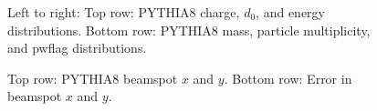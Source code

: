 \begin{figure}[H]
\hfill
\caption{Left to right: Top row: PYTHIA8 charge, $d_0$, and energy distributions. Bottom row: PYTHIA8 mass, particle multiplicity, and pwflag distributions.}
\end{figure}

\begin{figure}[H]
\centering
{}\hfill
{}\hfill %
\hfill
{}\hfill
\caption{Top row: PYTHIA8 beamspot $x$ and $y$. Bottom row: Error in beamspot $x$ and $y$.}
\end{figure}


